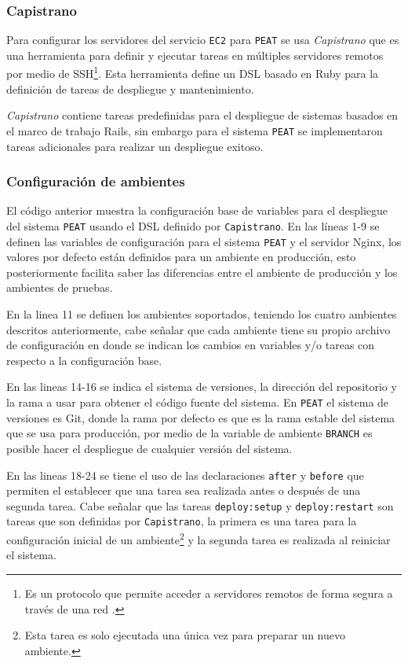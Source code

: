 \subsubsection{Capistrano}

Para configurar los servidores del servicio \texttt{EC2} para \texttt{PEAT} se usa
\textit{Capistrano} que es una herramienta para definir y ejecutar tareas en
múltiples servidores remotos por medio de SSH\footnote{Es un protocolo que permite
  acceder a servidores remotos de forma segura a través de una red
  \cite{29_ssh_protocol}.}. Esta herramienta define un DSL basado en Ruby para la
definición de tareas de despliegue y mantenimiento.

\textit{Capistrano} contiene tareas predefinidas para el despliegue de sistemas
basados en el marco de trabajo Rails, sin embargo para el sistema \texttt{PEAT} se
implementaron tareas adicionales para realizar un despliegue exitoso.

\subsubsection{Configuración de ambientes}



El código anterior muestra la configuración base de variables para el
despliegue del sistema \texttt{PEAT} usando el DSL definido por \texttt{Capistrano}.
En las líneas 1-9 se definen las variables de configuración para el sistema
\texttt{PEAT} y el servidor Nginx, los valores por defecto están definidos
para un ambiente en producción, esto posteriormente facilita saber las diferencias
entre el ambiente de producción y los ambientes de pruebas.

En la linea 11 se definen los ambientes soportados, teniendo los cuatro
ambientes descritos anteriormente, cabe señalar que cada ambiente tiene
su propio archivo de configuración en donde se indican los cambios en variables
y/o tareas con respecto a la configuración base.

En las lineas 14-16 se indica el sistema de versiones, la dirección del repositorio
y la rama a usar para obtener el código fuente del sistema.
En \texttt{PEAT} el sistema de versiones es Git, donde la rama por defecto
es  que es la rama estable del sistema que
se usa para producción, por medio de la variable de ambiente \texttt{BRANCH} es
posible hacer el despliegue de cualquier versión del sistema.

En las lineas 18-24 se tiene el uso de las declaraciones \texttt{after}
y \texttt{before} que permiten el establecer que una tarea sea realizada
antes o después de una segunda tarea. Cabe señalar que las tareas
\texttt{deploy:setup} y \texttt{deploy:restart} son tareas que son definidas
por \texttt{Capistrano}, la primera es una tarea para la configuración inicial
de un ambiente\footnote{Esta tarea es solo ejecutada una única vez para preparar
  un nuevo ambiente.} y la segunda tarea es realizada al reiniciar el sistema.

